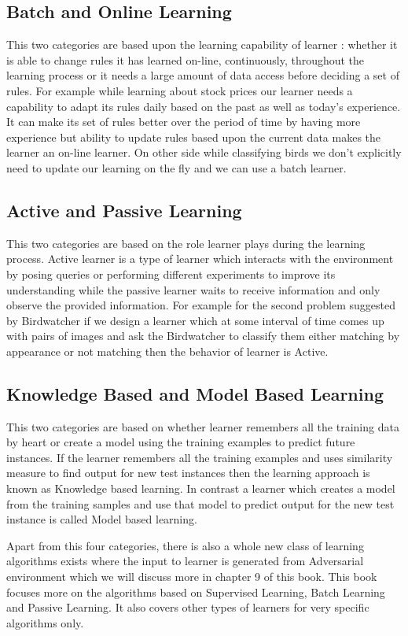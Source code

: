 \documentclass[a4paper]{article}
\begin{document}
\subsection{Batch and Online Learning}
This two categories are based upon the learning capability of learner : whether it is able to change rules it has learned on-line, continuously, throughout the learning process or it needs a large amount of data access before deciding a set of rules. For example while learning about stock prices our learner needs a capability to adapt its rules daily based on the past as well as today's experience. It can make its set of rules better over the period of time by having more experience but ability to update rules based upon the current data makes the learner an on-line learner. On other side while classifying birds we don't explicitly need to update our learning on the fly and we can use a batch learner.

\subsection{Active and Passive Learning}
This two categories are based on the role learner plays during the learning process. Active learner is a type of learner which interacts with the environment by posing queries or performing different experiments to improve its understanding while the passive learner waits to receive information and only observe the provided information. For example for the second problem suggested by Birdwatcher if we design a learner which at some interval of time comes up with pairs of images and ask the Birdwatcher to classify them either matching by appearance or not matching then the behavior of learner is Active.  

\subsection{Knowledge Based and Model Based Learning}
This two categories are based on whether learner remembers all the training data by heart or create a model using the training examples to predict future instances. If the learner remembers all the training examples and uses similarity measure to find output for new test instances then the learning approach is known as Knowledge based learning. In contrast a learner which creates a model from the training samples and use that model to predict output for the new test instance is called Model based learning. 

Apart from this four categories, there is also a whole new class of learning algorithms exists where the input to learner is generated from Adversarial environment which we will discuss more in chapter 9 of this book. This book focuses more on the algorithms based on Supervised Learning, Batch Learning and Passive Learning. It also covers other types of learners for very specific algorithms only.  
\end{document}
